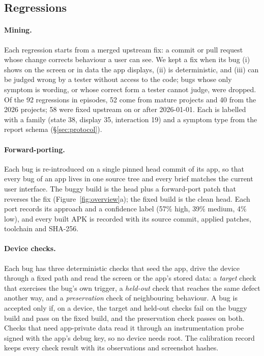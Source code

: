 \documentclass[11pt]{article}
\begin{document}
\subsection{Regressions}\label{sec:regressions}
\paragraph{Mining.} Each regression starts from a merged upstream fix: a commit or pull request
whose change corrects behaviour a user can see. We kept a fix when its bug (i) shows on the screen
or in data the app displays, (ii) is deterministic, and (iii) can be judged wrong by a tester
without access to the code; bugs whose only symptom is wording, or whose correct form a tester
cannot judge, were dropped. Of the 92 regressions in episodes, 52 come from mature projects and
40 from the 2026 projects; 58 were fixed upstream on or after 2026-01-01. Each is labelled with a
family (state 38, display 35, interaction 19) and a symptom type from the report schema
(\S\ref{sec:protocol}).

\paragraph{Forward-porting.} Each bug is re-introduced on a single pinned head commit of its app,
so that every bug of an app lives in one source tree and every brief matches the current user
interface. The buggy build is the head plus a forward-port patch that reverses the fix (Figure~\ref{fig:overview}a);
the fixed build is the clean head. Each port records its approach and a confidence label (57\%
high, 39\% medium, 4\% low), and every built APK is recorded with its source commit, applied
patches, toolchain and SHA-256.

\paragraph{Device checks.} Each bug has three deterministic checks that seed the app, drive the
device through a fixed path and read the screen or the app's stored data:
a \emph{target} check that exercises the bug's own trigger, a \emph{held-out} check that reaches
the same defect another way, and a \emph{preservation} check of neighbouring behaviour. A bug is
accepted only if, on a device, the target and held-out checks fail on the buggy build and pass on
the fixed build, and the preservation check passes on both. Checks that need app-private data
read it through an instrumentation probe signed with the app's debug key, so no device needs
root. The calibration record keeps every check result with its observations and screenshot hashes.
\end{document}
